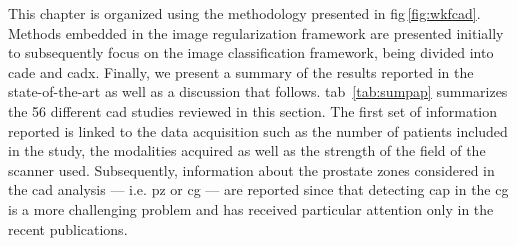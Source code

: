 


This chapter is organized using the methodology presented in \acs{fig}\,\ref{fig:wkfcad}.
Methods embedded in the image regularization framework are presented initially to subsequently focus on the image classification framework, being divided into \ac{cade} and \ac{cadx}.
Finally, we present a summary of the results reported in the state-of-the-art as well as a discussion that follows.
\Acl{tab}~\ref{tab:sumpap} summarizes the 56 different \ac{cad} studies reviewed in this section.
The first set of information reported is linked to the data acquisition such as the number of patients included in the study, the modalities acquired as well as the strength of the field of the scanner used.
Subsequently, information about the prostate zones considered in the \ac{cad} analysis --- i.e. \ac{pz} or \ac{cg} --- are reported since that detecting \ac{cap} in the \ac{cg} is a more challenging problem and has received particular attention only in the recent publications.






